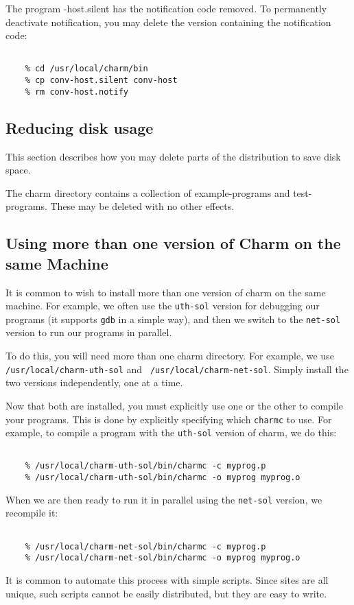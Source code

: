 The program {\conv-host.silent} has the notification code removed.  To
permanently deactivate notification, you may delete the version containing
the notification code:

\begin{verbatim}

    % cd /usr/local/charm/bin
    % cp conv-host.silent conv-host
    % rm conv-host.notify

\end{verbatim}

\subsection{Reducing disk usage}

This section describes how you may delete parts of the distribution
to save disk space.

The charm directory contains a collection of example-programs and
test-programs.  These may be deleted with no other effects.

\subsection{Using more than one version of Charm on the same Machine}

It is common to wish to install more than one version of charm on the
same machine.  For example, we often use the {\tt uth-sol} version for
debugging our programs (it supports {\tt gdb} in a simple way), and
then we switch to the {\tt net-sol} version to run our programs in
parallel.

To do this, you will need more than one charm directory.  For example,
we use {\tt /usr/local/charm-uth-sol} and {\tt
/usr/local/charm-net-sol}.  Simply install the two versions
independently, one at a time.

Now that both are installed, you must explicitly use one or the other
to compile your programs.  This is done by explicitly specifying which
{\tt charmc} to use.  For example, to compile a program with the {\tt uth-sol}
version of charm, we do this:

\begin{verbatim}

    % /usr/local/charm-uth-sol/bin/charmc -c myprog.p
    % /usr/local/charm-uth-sol/bin/charmc -o myprog myprog.o

\end{verbatim}

When we are then ready to run it in parallel using the {\tt net-sol}
version, we recompile it:

\begin{verbatim}

    % /usr/local/charm-net-sol/bin/charmc -c myprog.p
    % /usr/local/charm-net-sol/bin/charmc -o myprog myprog.o

\end{verbatim}

It is common to automate this process with simple scripts.  Since sites
are all unique, such scripts cannot be easily distributed, but they are
easy to write.



